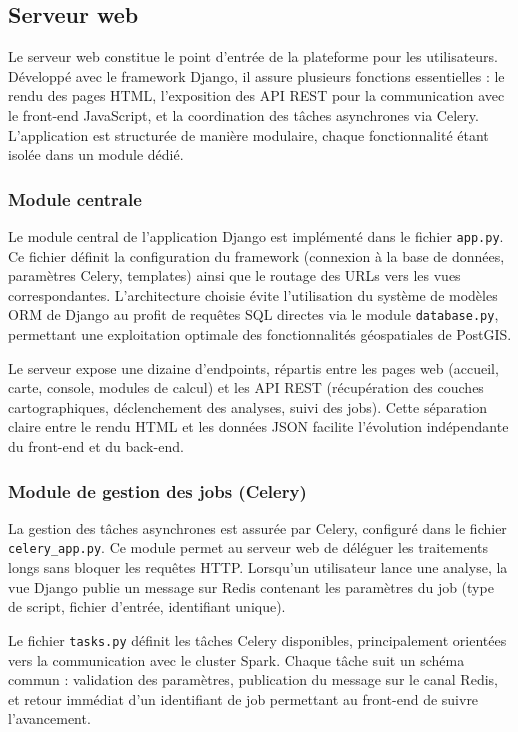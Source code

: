 \documentclass[french]{tai_info} %
\begin{document}
\subsection{Serveur web}

Le serveur web constitue le point d'entrée de la plateforme pour les utilisateurs. Développé avec le framework Django, il assure plusieurs fonctions essentielles : le rendu des pages HTML, l'exposition des API REST pour la communication avec le front-end JavaScript, et la coordination des tâches asynchrones via Celery. L'application est structurée de manière modulaire, chaque fonctionnalité étant isolée dans un module dédié.

\subsubsection{Module centrale}

Le module central de l'application Django est implémenté dans le fichier \texttt{app.py}. Ce fichier définit la configuration du framework (connexion à la base de données, paramètres Celery, templates) ainsi que le routage des URLs vers les vues correspondantes. L'architecture choisie évite l'utilisation du système de modèles ORM de Django au profit de requêtes SQL directes via le module \texttt{database.py}, permettant une exploitation optimale des fonctionnalités géospatiales de PostGIS.

Le serveur expose une dizaine d'endpoints, répartis entre les pages web (accueil, carte, console, modules de calcul) et les API REST (récupération des couches cartographiques, déclenchement des analyses, suivi des jobs). Cette séparation claire entre le rendu HTML et les données JSON facilite l'évolution indépendante du front-end et du back-end.

\subsubsection{Module de gestion des jobs (Celery)}

La gestion des tâches asynchrones est assurée par Celery, configuré dans le fichier \texttt{celery\_app.py}. Ce module permet au serveur web de déléguer les traitements longs sans bloquer les requêtes HTTP. Lorsqu'un utilisateur lance une analyse, la vue Django publie un message sur Redis contenant les paramètres du job (type de script, fichier d'entrée, identifiant unique).

Le fichier \texttt{tasks.py} définit les tâches Celery disponibles, principalement orientées vers la communication avec le cluster Spark. Chaque tâche suit un schéma commun : validation des paramètres, publication du message sur le canal Redis, et retour immédiat d'un identifiant de job permettant au front-end de suivre l'avancement.
\end{document}
